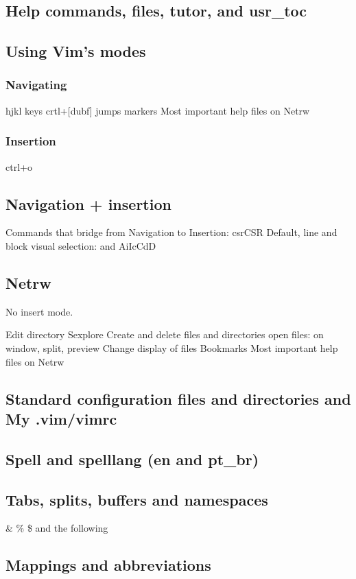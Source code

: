 \documentclass{article}
\begin{document}
\subsection{Help commands, files, tutor, and usr\_toc}

\subsection{Using Vim's modes}
\subsubsection{Navigating}
hjkl keys
crtl+[dubf]
jumps
markers
Most important help files on Netrw

\subsubsection{Insertion}
ctrl+o

\subsection{Navigation + insertion}
Commands that bridge from Navigation to Insertion:
csrCSR
Default, line and block visual selection:
  and AiIcCdD

\subsection{Netrw}
No insert mode.

Edit directory
Sexplore
Create and delete files and directories
open files: on window, split, preview
Change display of files
Bookmarks
Most important help files on Netrw


\subsection{Standard configuration files and directories and My .vim/vimrc}
\subsection{Spell and spelllang (en and pt\_br)}
\subsection{Tabs, splits, buffers and namespaces}
\& \% \$ and the following
\subsection{Mappings and abbreviations}
\end{document}
